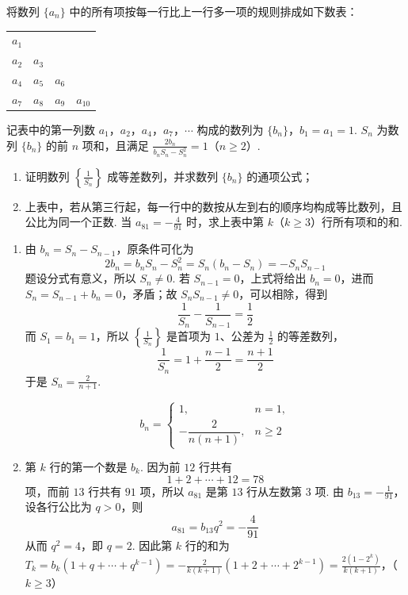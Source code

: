 \begin{problem}
将数列 \(\{a_{n}\}\) 中的所有项按每一行比上一行多一项的规则排成如下数表：
\begin{center}
\begin{tabular}{cccc}
\(a_1\) & & & \\
\(a_2\) & \(a_3\) & & \\
\(a_4\) & \(a_5\) & \(a_6\) & \\
\(a_7\) & \(a_8\) & \(a_9\) & \(a_{10}\)
\end{tabular}
\end{center}
记表中的第一列数 \(a_1\)，\(a_2\)，\(a_4\)，\(a_7\)，\(\cdots\) 构成的数列为 \(\{b_n\}\)，\(b_1 = a_1 = 1\). \(S_n\) 为数列 \(\{b_n\}\) 的前 \(n\) 项和，且满足 \(\frac{2b_n}{b_n S_n - S_n^{2}} = 1\)（\(n \geqslant 2\)）.
\begin{enumerate}
\item 证明数列 \(\left\{\frac{1}{S_n}\right\}\) 成等差数列，并求数列 \(\{b_n\}\) 的通项公式；
\item 上表中，若从第三行起，每一行中的数按从左到右的顺序均构成等比数列，且公比为同一个正数. 当 \(a_{81} = -\frac{4}{91}\) 时，求上表中第 \(k\)（\(k \geqslant 3\)）行所有项和的和.
\end{enumerate}
\end{problem}

\begin{solution}
\begin{enumerate}
\item 由 \(b_n=S_n-S_{n-1}\)，原条件可化为
\[
2b_n=b_nS_n-S_n^2=S_n(b_n-S_n)=-S_nS_{n-1}
\]
题设分式有意义，所以 \(S_n\neq0\). 若 \(S_{n-1}=0\)，上式将给出 \(b_n=0\)，进而 \(S_n=S_{n-1}+b_n=0\)，矛盾；故 \(S_nS_{n-1}\neq0\)，可以相除，得到
\[
\frac1{S_n}-\frac1{S_{n-1}}=\frac12
\]
而 \(S_1=b_1=1\)，所以 \(\left\{\frac1{S_n}\right\}\) 是首项为 \(1\)、公差为 \(\frac12\) 的等差数列，
\[
\frac1{S_n}=1+\frac{n-1}{2}=\frac{n+1}{2}
\]
于是 \(S_n=\frac2{n+1}\).

\[
b_n=\begin{cases}
1, & n=1,\\
-\dfrac{2}{n(n+1)}, & n\geqslant 2
\end{cases}
\]
\item 第 \(k\) 行的第一个数是 \(b_k\). 因为前 \(12\) 行共有
\[
1+2+\cdots+12=78
\]
项，而前 \(13\) 行共有 \(91\) 项，所以 \(a_{81}\) 是第 \(13\) 行从左数第 \(3\) 项. 由 \(b_{13}=-\frac1{91}\)，设各行公比为 \(q>0\)，则
\[
a_{81}=b_{13}q^2=-\frac4{91}
\]
从而 \(q^2=4\)，即 \(q=2\). 因此第 \(k\) 行的和为
\(T_k=b_k(1+q+\cdots+q^{k-1}) =-\frac2{k(k+1)}(1+2+\cdots+2^{k-1}) =\frac{2(1-2^k)}{k(k+1)}\)，（\(k\geqslant3\)）
\end{enumerate}
\end{solution}

